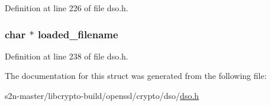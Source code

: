 Definition at line 226 of file dso.\+h.

\subsubsection[{\texorpdfstring{loaded\+\_\+filename}{loaded_filename}}]{\setlength{\rightskip}{0pt plus 5cm}char $\ast$ loaded\+\_\+filename}\hypertarget{structdso__st_a533c4d7863b8f99df6d5372cdbd39260}{}\label{structdso__st_a533c4d7863b8f99df6d5372cdbd39260}


Definition at line 238 of file dso.\+h.



The documentation for this struct was generated from the following file\+:\begin{DoxyCompactItemize}
\item 
s2n-\/master/libcrypto-\/build/openssl/crypto/dso/\hyperlink{crypto_2dso_2dso_8h}{dso.\+h}\end{DoxyCompactItemize}
